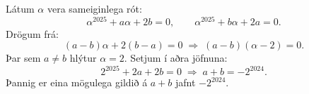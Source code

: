 Látum $\alpha$ vera sameiginlega rót:
\[
\alpha^{2025}+a\alpha+2b=0,\qquad
\alpha^{2025}+b\alpha+2a=0.
\]
Drögum frá:
\[
(a-b)\alpha + 2(b-a)=0 \;\Rightarrow\; (a-b)(\alpha-2)=0.
\]
Þar sem $a\ne b$ hlýtur $\alpha=2$.
Setjum í aðra jöfnuna:
\[
2^{2025}+2a+2b=0 \;\Rightarrow\; a+b=-2^{2024}.
\]
Þannig er eina mögulega gildið á $a+b$ jafnt $-2^{2024}$.